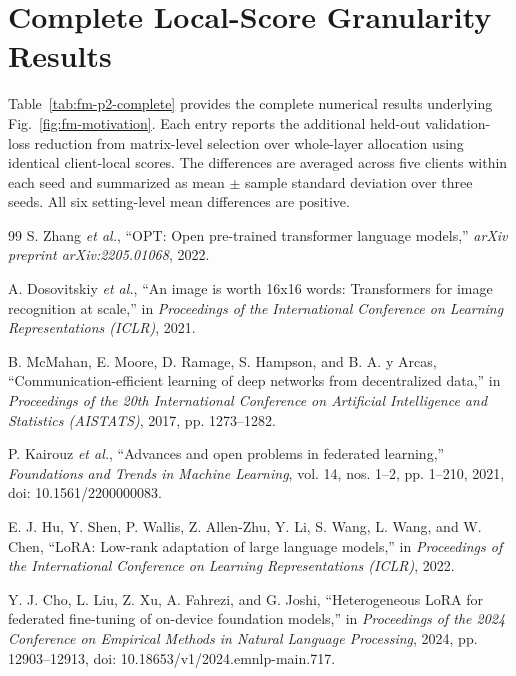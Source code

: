 \documentclass[10pt,conference,letterpaper]{IEEEtran}
\begin{document}
\section{Complete Local-Score Granularity Results}
\label{app:fm-p2-details}
Table~\ref{tab:fm-p2-complete} provides the complete numerical results underlying Fig.~\ref{fig:fm-motivation}. Each entry reports the additional held-out validation-loss reduction from matrix-level selection over whole-layer allocation using identical client-local scores. The differences are averaged across five clients within each seed and summarized as mean $\pm$ sample standard deviation over three seeds. All six setting-level mean differences are positive.


\FloatBarrier
\begin{thebibliography}{99}
S. Zhang \emph{et al.},
``OPT: Open pre-trained transformer language models,''
\emph{arXiv preprint arXiv:2205.01068}, 2022.

A. Dosovitskiy \emph{et al.},
``An image is worth 16x16 words: Transformers for image recognition at scale,''
in \emph{Proceedings of the International Conference on Learning Representations (ICLR)}, 2021.

B. McMahan, E. Moore, D. Ramage, S. Hampson, and B. A. y Arcas,
``Communication-efficient learning of deep networks from decentralized data,''
in \emph{Proceedings of the 20th International Conference on Artificial Intelligence and Statistics (AISTATS)}, 2017, pp. 1273--1282.

P. Kairouz \emph{et al.},
``Advances and open problems in federated learning,''
\emph{Foundations and Trends in Machine Learning}, vol. 14, nos. 1--2, pp. 1--210, 2021,
doi: 10.1561/2200000083.

E. J. Hu, Y. Shen, P. Wallis, Z. Allen-Zhu, Y. Li, S. Wang, L. Wang, and W. Chen,
``LoRA: Low-rank adaptation of large language models,''
in \emph{Proceedings of the International Conference on Learning Representations (ICLR)}, 2022.

Y. J. Cho, L. Liu, Z. Xu, A. Fahrezi, and G. Joshi,
``Heterogeneous LoRA for federated fine-tuning of on-device foundation models,''
in \emph{Proceedings of the 2024 Conference on Empirical Methods in Natural Language Processing}, 2024, pp. 12903--12913,
doi: 10.18653/v1/2024.emnlp-main.717.


\end{thebibliography}
\end{document}
